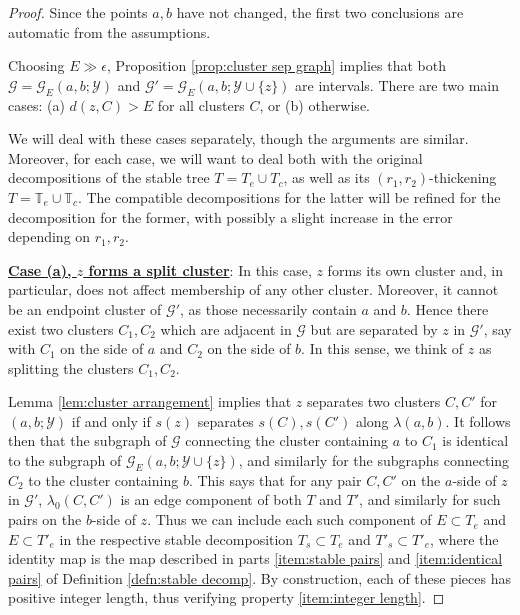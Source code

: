 \documentclass[10pt,a4paper]{amsart}
\newcommand{\bT}{\mathbb{T}}
\newcommand{\calG}{\mathcal{G}}
\newcommand{\calY}{\mathcal{Y}}
\begin{document}
\begin{proof}
Since the points $a,b$ have not changed, the first two conclusions are automatic from the assumptions.

Choosing $E \gg \epsilon$, Proposition \ref{prop:cluster sep graph} implies that both $\calG = \calG_E(a,b;\calY)$ and $\calG' = \calG_E(a,b;\calY \cup \{z\})$ are intervals.  There are two main cases: (a) $d(z,C)>E$ for all clusters $C$, or (b) otherwise.

We will deal with these cases separately, though the arguments are similar.  Moreover, for each case, we will want to deal both with the original decompositions of the stable tree $T = T_e \cup T_c$, as well as its $(r_1,r_2)$-thickening $T = \bT_{e} \cup \bT_{c}$.  The compatible decompositions for the latter will be refined for the decomposition for the former, with possibly a slight increase in the error depending on $r_1,r_2$.

\medskip

\underline{\textbf{Case (a), $z$ forms a split cluster}}: In this case, $z$ forms its own cluster and, in particular, does not affect membership of any other cluster.  Moreover, it cannot be an endpoint cluster of $\calG'$, as those necessarily contain $a$ and $b$.  Hence there exist two clusters $C_1,C_2$ which are adjacent in $\calG$ but are separated by $z$ in $\calG'$, say with $C_1$ on the side of $a$ and $C_2$ on the side of $b$.  In this sense, we think of $z$ as splitting the clusters $C_1,C_2$.

Lemma \ref{lem:cluster arrangement} implies that $z$ separates two clusters $C,C'$ for $(a,b;\calY)$ if and only if $s(z)$ separates $s(C), s(C')$ along $\lambda(a,b)$.  It follows then that the subgraph of $\calG$ connecting the cluster containing $a$ to $C_1$ is identical to the subgraph of $\calG_E(a,b;\calY \cup \{z\})$, and similarly for the subgraphs connecting $C_2$ to the cluster containing $b$.  This says that for any pair $C,C'$ on the $a$-side of $z$ in $\calG'$, $\lambda_0(C,C')$ is an edge component of both $T$ and $T'$, and similarly for such pairs  on the $b$-side of $z$.  Thus we can include each such component of $E \subset T_e$ and $E \subset T'_e$ in the respective stable decomposition $T_s \subset T_e$ and $T'_s \subset T'_e$, where the identity map is the map described in parts \eqref{item:stable pairs} and \eqref{item:identical pairs} of Definition \ref{defn:stable decomp}.  By construction, each of these pieces has positive integer length, thus verifying property \eqref{item:integer length}.


\end{proof}
\end{document}
